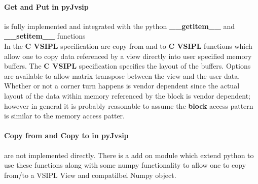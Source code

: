 \documentclass[11pt, oneside]{article}
\newcommand{\cvl}{\ttbf{C VSIPL}}
\newcommand{\pyjv}{{\ttbf{pyJvsip}}}
\newcommand{\ttbf}[1]{{\ttfamily \bfseries #1}}
\newcommand{\blk}{\ttbf{block}}
\begin{document}
\paragraph{Get and Put in \pyjv{}} is fully implemented and integrated with the python \ttbf{\_\_getitem\_\_} and \ttbf{\_\_setitem\_\_} functions
\\[6pt]
In the \cvl{} specification are copy from and to \cvl{} functions which allow one to copy data referenced by a view directly into user specified memory buffers.  The \cvl{} specification specifies the layout of the buffers. Options are available to allow matrix transpose between the view and the user data.  Whether or not a corner turn happens is vendor dependent since the actual layout of the data within memory referenced by the block is vendor dependent; however in general it is probably reasonable to assume the \blk{} access pattern is similar to the memory access patter.
\paragraph{Copy from and Copy to in \pyjv{}} are not implemented directly.  There is a add on module which extend python to use these functions along with some numpy functionality to allow one to copy from/to a VSIPL View and compatilbel Numpy object.
\end{document}
